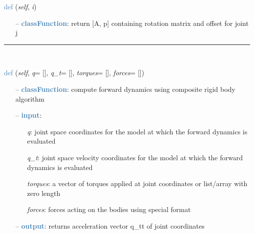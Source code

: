 \begin{itemize}[leftmargin=1.4cm]
\begin{itemize}[leftmargin=0.5cm]
\begin{itemize}[leftmargin=1.4cm]
\begin{itemize}[leftmargin=0.5cm]
\begin{itemize}[leftmargin=1.4cm]
\begin{itemize}[leftmargin=0.5cm]
\begin{itemize}[leftmargin=1.4cm]
\begin{itemize}[leftmargin=1.4cm]
\begin{itemize}[leftmargin=1.4cm]
\begin{flushleft}
\noindent \textcolor{steelblue}{def {\bf {}}}\label{sec:kinematicTree:KinematicTree:XL}
({\it self}, {\it i})
\end{flushleft}
\setlength{\itemindent}{0.7cm}
\begin{itemize}[leftmargin=0.7cm]
  \item[--]  \textcolor{steelblue}{\bf classFunction}: return [A, p] containing rotation matrix and offset for joint j\vspace{12pt}\end{itemize}
%
\noindent\rule{8cm}{0.75pt}\vspace{1pt} \\ 
\begin{flushleft}
\noindent \textcolor{steelblue}{def {\bf {}}}\label{sec:kinematicTree:KinematicTree:ForwardDynamicsCRB}
({\it self}, {\it q}= [], {\it q\_t}= [], {\it torques}= [], {\it forces}= [])
\end{flushleft}
\setlength{\itemindent}{0.7cm}
\begin{itemize}[leftmargin=0.7cm]
  \item[--]  \textcolor{steelblue}{\bf classFunction}: compute forward dynamics using composite rigid body algorithm  \item[--]  \textcolor{steelblue}{\bf input}: \vspace{-6pt}
  \begin{itemize}[leftmargin=1.2cm]
\setlength{\itemindent}{-0.7cm}
    \item[] {\it q}: joint space coordinates for the model at which the forward dynamics is evaluated
    \item[] {\it   q\_t}: joint space velocity coordinates for the model at which the forward dynamics is evaluated
    \item[] {\it   torques}: a vector of torques applied at joint coordinates or list/array with zero length
    \item[] {\it   forces}: forces acting on the bodies using special format
  \end{itemize}
  \item[--]  \textcolor{steelblue}{\bf output}: returns acceleration vector q\_tt of joint coordinates\vspace{12pt}\end{itemize}

\end{itemize}
\end{itemize}
\end{itemize}
\end{itemize}
\end{itemize}
\end{itemize}
\end{itemize}
\end{itemize}
\end{itemize}
